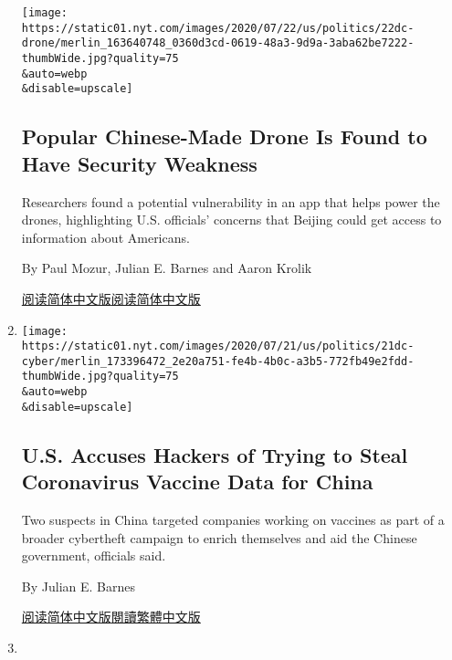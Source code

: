 \begin{enumerate}
  \texttt{[image: https://static01.nyt.com/images/2020/07/22/us/politics/22dc-drone/merlin\_163640748\_0360d3cd-0619-48a3-9d9a-3aba62be7222-thumbWide.jpg?quality=75\\\&auto=webp\\\&disable=upscale]}

  \hypertarget{popular-chinese-made-drone-is-found-to-have-security-weakness}{%
  \subsection{Popular Chinese-Made Drone Is Found to Have Security
  Weakness}\label{popular-chinese-made-drone-is-found-to-have-security-weakness}}

  Researchers found a potential vulnerability in an app that helps power
  the drones, highlighting U.S. officials' concerns that Beijing could
  get access to information about Americans.

  By Paul Mozur, Julian E. Barnes and Aaron Krolik

  \href{https://cn.nytimes.com/usa/20200724/dji-drones-security-vulnerability/}{阅读简体中文版}\href{https://cn.nytimes.com/usa/20200724/dji-drones-security-vulnerability/}{阅读简体中文版}
\item
  \href{/2020/07/21/us/politics/china-hacking-coronavirus-vaccine.html}{}

  \texttt{[image: https://static01.nyt.com/images/2020/07/21/us/politics/21dc-cyber/merlin\_173396472\_2e20a751-fe4b-4b0c-a3b5-772fb49e2fdd-thumbWide.jpg?quality=75\\\&auto=webp\\\&disable=upscale]}

  \hypertarget{us-accuses-hackers-of-trying-to-steal-coronavirus-vaccine-data-for-china}{%
  \subsection{U.S. Accuses Hackers of Trying to Steal Coronavirus
  Vaccine Data for
  China}\label{us-accuses-hackers-of-trying-to-steal-coronavirus-vaccine-data-for-china}}

  Two suspects in China targeted companies working on vaccines as part
  of a broader cybertheft campaign to enrich themselves and aid the
  Chinese government, officials said.

  By Julian E. Barnes

  \href{https://cn.nytimes.com/usa/20200722/china-hacking-coronavirus-vaccine/}{阅读简体中文版}\href{https://cn.nytimes.com/usa/20200722/china-hacking-coronavirus-vaccine/zh-hant/}{閱讀繁體中文版}
\item
  \href{/2020/07/20/us/politics/congress-disinformation-biden-russia-ukraine.html}{}


\end{enumerate}
